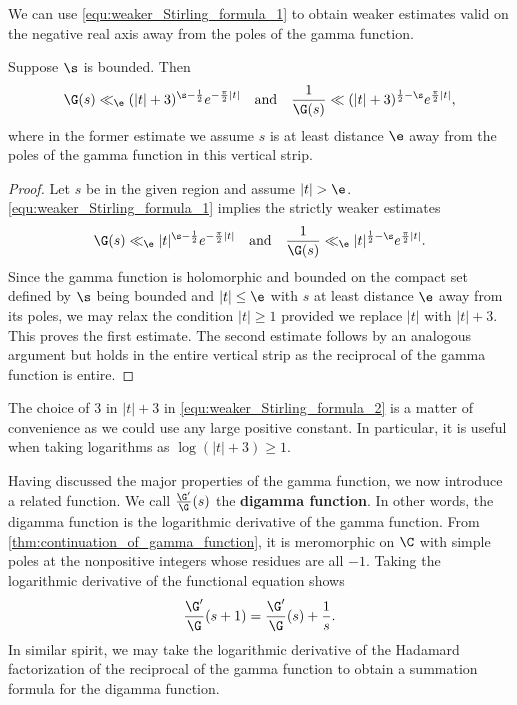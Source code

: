 \documentclass[12pt]{article}
\begin{document}
      We can use \cref{equ:weaker_Stirling_formula_1} to obtain weaker estimates valid on the negative real axis away from the poles of the gamma function.

      \begin{corollary}\label{equ:weaker_Stirling_formula_2}
        Suppose \(\s\) is bounded. Then
        \[
          \G(s) \ll_{\e} (|t|+3)^{\s-\frac{1}{2}}e^{-\frac{\pi}{2}|t|} \quad \text{and} \quad \frac{1}{\G(s)} \ll (|t|+3)^{\frac{1}{2}-\s}e^{\frac{\pi}{2}|t|},
        \]
        where in the former estimate we assume \(s\) is at least distance \(\e\) away from the poles of the gamma function in this vertical strip.
      \end{corollary}
      \begin{proof}
        Let \(s\) be in the given region and assume \(|t| > \e\). \cref{equ:weaker_Stirling_formula_1} implies the strictly weaker estimates
        \[
          \G(s) \ll_{\e} |t|^{\s-\frac{1}{2}}e^{-\frac{\pi}{2}|t|} \quad \text{and} \quad \frac{1}{\G(s)} \ll_{\e} |t|^{\frac{1}{2}-\s}e^{\frac{\pi}{2}|t|}.
        \]
        Since the gamma function is holomorphic and bounded on the compact set defined by \(\s\) being bounded and \(|t| \le \e\) with \(s\) at least distance \(\e\) away from its poles, we may relax the condition \(|t| \ge 1\) provided we replace \(|t|\) with \(|t|+3\). This proves the first estimate. The second estimate follows by an analogous argument but holds in the entire vertical strip as the reciprocal of the gamma function is entire.
      \end{proof}

      The choice of \(3\) in \(|t|+3\) in \cref{equ:weaker_Stirling_formula_2} is a matter of convenience as we could use any large positive constant. In particular, it is useful when taking logarithms as \(\log(|t|+3) \ge 1\).

      Having discussed the major properties of the gamma function, we now introduce a related function. We call \(\frac{\G'}{\G}(s)\) the \textbf{digamma function}. In other words, the digamma function is the logarithmic derivative of the gamma function. From \cref{thm:continuation_of_gamma_function}, it is meromorphic on \(\C\) with simple poles at the nonpositive integers whose residues are all \(-1\). Taking the logarithmic derivative of the functional equation shows
      \[
        \frac{\G'}{\G}(s+1) = \frac{\G'}{\G}(s)+\frac{1}{s}.
      \]
      In similar spirit, we may take the logarithmic derivative of the Hadamard factorization of the reciprocal of the gamma function to obtain a summation formula for the digamma function.
\end{document}
